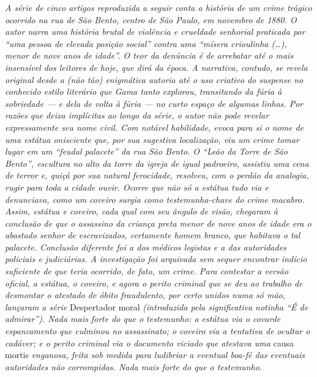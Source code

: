 {\begin{didas}
\emph{A série de cinco artigos reproduzida a seguir conta a história de
um crime trágico ocorrido na rua de São Bento, centro de São Paulo, em
novembro de 1880. O autor narra uma história brutal de violência e
crueldade senhorial praticada por ``uma pessoa de elevada posição social''
contra uma ``mísera crioulinha (\ldots{}), menor de nove anos de idade''. O teor
da denúncia é de arrebatar até o mais insensível dos leitores de hoje,
que dirá da época. A narrativa, contudo, se revela original desde a (não
tão) enigmática autoria até o uso criativo do suspense no conhecido
estilo literário que Gama tanto explorou, transitando da fúria à
sobriedade --- e dela de volta à fúria --- no curto espaço de algumas
linhas. Por razões que deixa implícitas ao longo da série, o autor não
pode revelar expressamente seu nome civil. Com notável habilidade,
evoca para si o nome de uma estátua onisciente que, por sua
sugestiva localização, viu um crime tomar lugar em um ``feudal palacete''
da rua São Bento. O ``Leão da Torre de São Bento'', escultura no alto da
torre da igreja de igual padroeiro, assistiu uma cena de terror e, quiçá
por sua natural ferocidade, resolveu, com o perdão da analogia, rugir
para toda a cidade ouvir. Ocorre que não só a estátua tudo via e
denunciava, como um coveiro surgia como testemunha-chave do crime
macabro. Assim, estátua e coveiro, cada qual com seu ângulo de visão,
chegaram à conclusão de que o assassino da criança preta menor
de nove anos de idade era o abastado senhor de escravizados, certamente
homem branco, que habitava o tal palacete. Conclusão diferente foi a dos
médicos legistas e a das autoridades policiais e judiciárias. A
investigação foi arquivada sem sequer encontrar indício suficiente de
que teria ocorrido, de fato, um crime. Para contestar a versão oficial,
a estátua, o coveiro, e agora o perito criminal que se deu ao trabalho
de desmontar o atestado de óbito fraudulento, por certo unidos numa só
mão, lançaram a série} Despertador moral \emph{(introduzida pela
significativa notinha ``É de admirar''). Nada mais forte do que o
testemunho: a estátua via o covarde espancamento que culminou no
assassinato; o coveiro via a tentativa de ocultar o cadáver; e o
perito criminal via o documento viciado que atestava uma} causa mortis
\emph{enganosa, feita sob medida para ludibriar a eventual boa-fé das
eventuais autoridades não corrompidas. Nada mais forte do que o
testemunho.}
\end{didas}


}
